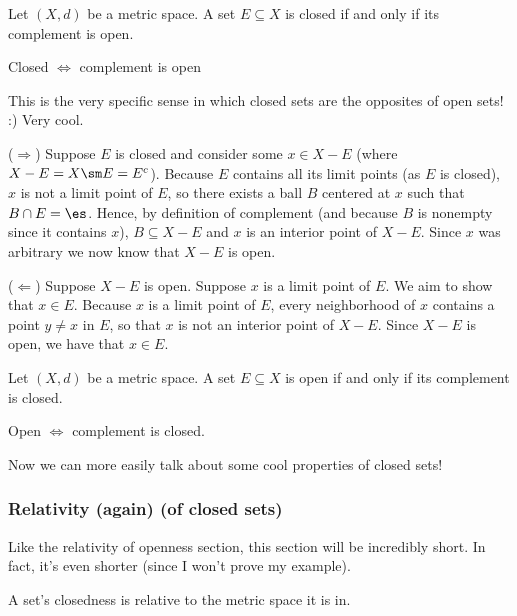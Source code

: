\documentclass[class=article, crop=false]{standalone}
\begin{document}
\begin{thm}{\label{thm:Alternate definition of closed set}}
    Let $(X,d)$ be a metric space. A set $E \subseteq X$ is closed if and only if its complement is open.
\end{thm}
\begin{slogan}
    Closed $\iff$ complement is open
\end{slogan}
This is the very specific sense in which closed sets are the opposites of open sets! :) Very cool.
\begin{pf}
    ($\Rightarrow$) Suppose $E$ is closed and consider some $x \in X-E$ (where $X-E = X \sm E = E^c$). Because $E$ contains all its limit points (as $E$ is closed), $x$ is not a limit point of $E$, so there exists a ball $B$ centered at $x$ such that $B \cap E = \es$. Hence, by definition of complement (and because $B$ is nonempty since it contains $x$), $B \subseteq X-E$ and $x$ is an interior point of $X-E$. Since $x$ was arbitrary we now know that $X-E$ is open.

    ($\Leftarrow$) Suppose $X-E$ is open. Suppose $x$ is a limit point of $E$. We aim to show that $x \in E$. Because $x$ is a limit point of $E$, every neighborhood of $x$ contains a point $y \neq x$ in $E$, so that $x$ is not an interior point of $X-E$. Since $X-E$ is open, we have that $x \in E$.
\end{pf}

\begin{coro}
    Let $(X,d)$ be a metric space. A set $E \subseteq X$ is open if and only if its complement is closed.
\end{coro}
\begin{slogan}
    Open $\iff$ complement is closed.
\end{slogan}

Now we can more easily talk about some cool properties of closed sets!



\subsubsection*{Relativity (again) (of closed sets)}

Like the relativity of openness section, this section will be incredibly short. In fact, it's even shorter (since I won't prove my example).
\begin{fact}
    A set's closedness is relative to the metric space it is in.
\end{fact}
\end{document}
